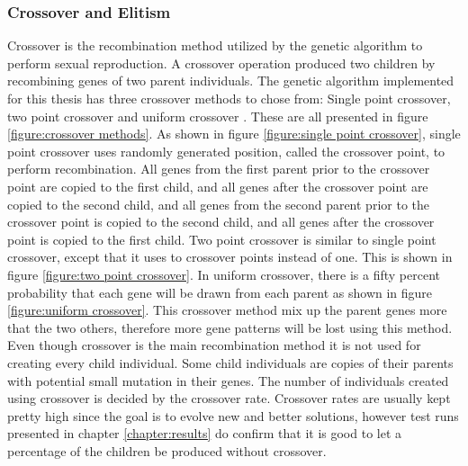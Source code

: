 \subsubsection{Crossover and Elitism}
Crossover is the recombination method utilized by the genetic algorithm to perform sexual reproduction. A crossover operation produced two children by recombining genes of two parent individuals. The genetic algorithm implemented for this thesis has three crossover methods to chose from: Single point crossover, two point crossover and uniform crossover \citep{Magalhaes-Mendes}. These are all presented in figure \ref{figure:crossover methods}. As shown in figure \ref{figure:single point crossover}, single point crossover uses randomly generated position, called the crossover point, to perform recombination. All genes from the first parent prior to the crossover point are copied to the first child, and all genes after the crossover point are copied to the second child, and all genes from the second parent prior to the crossover point is copied to the second child, and all genes after the crossover point is copied to the first child. Two point crossover is similar to single point crossover, except that it uses to crossover points instead of one. This is shown in figure \ref{figure:two point crossover}. In uniform crossover, there is a fifty percent probability that each gene will be drawn from each parent as shown in figure \ref{figure:uniform crossover}. This crossover method mix up the parent genes more that the two others, therefore more gene patterns will be lost using this method. Even though crossover is the main recombination method it is not used for creating every child individual. Some child individuals are copies of their parents with potential small mutation in their genes. The number of individuals created using crossover is decided by the crossover rate. Crossover rates are usually kept pretty high since the goal is to evolve new and better solutions, however test runs presented in chapter \ref{chapter:results} do confirm that it is good to let a percentage of the children be produced without crossover. \\


